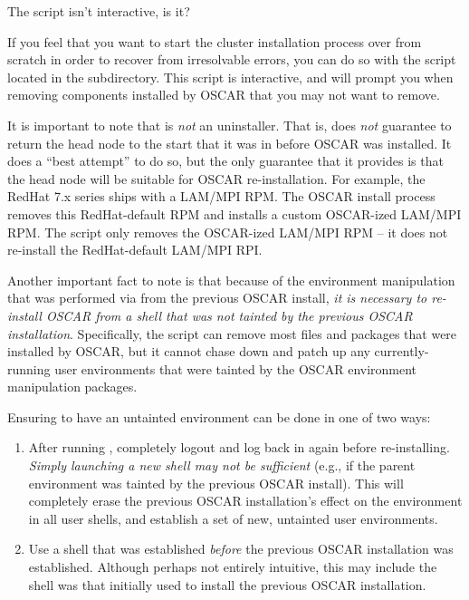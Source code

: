 \begin{discuss}
  The  script isn't interactive, is it?
\end{discuss}

If you feel that you want to start the cluster installation process
over from scratch in order to recover from irresolvable errors, you
can do so with the  script located in the
 subdirectory. This script is interactive, and will
prompt you when removing components installed by OSCAR that you may
not want to remove.

\begchange

It is important to note that  is {\em not} an
uninstaller.  That is,  does {\em not} guarantee to
return the head node to the start that it was in before OSCAR was
installed.  It does a ``best attempt'' to do so, but the only
guarantee that it provides is that the head node will be suitable for
OSCAR re-installation.  For example, the RedHat 7.x series ships with
a LAM/MPI RPM.  The OSCAR install process removes this RedHat-default
RPM and installs a custom OSCAR-ized LAM/MPI RPM.  The
 script only removes the OSCAR-ized LAM/MPI RPM -- it
does not re-install the RedHat-default LAM/MPI RPI.

Another important fact to note is that because of the environment
manipulation that was performed via  from the previous
OSCAR install, {\em it is necessary to re-install OSCAR from a shell
  that was not tainted by the previous OSCAR installation}.
Specifically, the  script can remove most files and
packages that were installed by OSCAR, but it cannot chase down and
patch up any currently-running user environments that were tainted by
the OSCAR environment manipulation packages.

Ensuring to have an untainted environment can be done in one of two
ways:

\begin{enumerate}
\item After running , completely logout and log back
  in again before re-installing.  {\em Simply launching a new shell
    may not be sufficient} (e.g., if the parent environment was
  tainted by the previous OSCAR install).  This will completely erase
  the previous OSCAR installation's effect on the environment in all
  user shells, and establish a set of new, untainted user
  environments.
  
\item Use a shell that was established {\em before} the previous OSCAR
  installation was established.  Although perhaps not entirely
  intuitive, this may include the shell was that initially used to
  install the previous OSCAR installation.
\end{enumerate}

\endchange


